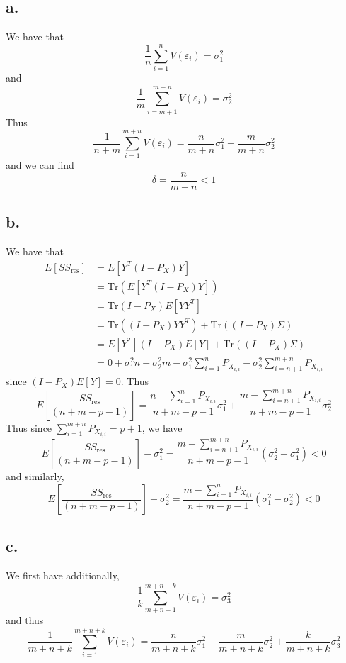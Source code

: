 \documentclass[11pt]{article}
\theoremstyle{mystyle}
\theoremstyle{definition}
\begin{document}
\subsection*{a.}
We have that 
\[
  \displaystyle\frac{1}{n} \sum_{i=1}^n V(\varepsilon_i) = \sigma_1^2
\]
and
\[
  \displaystyle\frac{1}{m} \sum_{i=m+1}^{m+n} V(\varepsilon_i) = \sigma_2^2
\]
Thus 
\[
  \displaystyle\frac{1}{n+m} \sum_{i=1}^{m+n} V(\varepsilon_i) = \displaystyle\frac{n}{m+n} \sigma_1^2 + \displaystyle\frac{m}{m+n} \sigma_2^2
\]
and we can find 
\[
  \delta = \displaystyle\frac{n}{m+n} < 1
\]
\subsection*{b.}
We have that 
\begin{align*} 
  E[SS_{\text{res}}] &= E[Y^T (I-P_X)Y]  \\
  &= \text{Tr}(E[Y^T (I-P_X)Y]) \\
  &= \text{Tr}(I-P_X) E[YY^T] \\
  &= \text{Tr}((I-P_X)YY^T) + \text{Tr}((I-P_X)\Sigma)  \\
  &= E[Y^T] (I-P_X)E[Y] + \text{Tr} ((I-P_X) \Sigma) \\
  &= 0 + \sigma_1^2 n + \sigma_2^2 m - \sigma_1^2 \sum_{i=1}^n P_{X_{i,i}} - \sigma_2^2 \sum_{i=n+1}^{m+n} P_{X_{i,i}}
\end{align*}
since $(I-P_X)E[Y]= 0$. 
Thus 
\[
  E\left[\frac{SS_{\text{res}}}{(n+m-p-1)}\right] = \displaystyle\frac{n- \sum_{i=1}^n P_{X_{i,i}}}{n+m-p-1}\sigma_1^2 + \displaystyle\frac{m-\sum_{i=n+1}^{m+n} P_{X_{i,i}}}{n+m-p-1} \sigma_2^2  
\]
Thus since $\sum_{i=1}^{m+n} P_{X_{i,i}} = p+1$, we have 
\[
  E\left[\frac{SS_{\text{res}}}{(n+m-p-1)}\right] - \sigma_1^2 =   \displaystyle\frac{m-\sum_{i=n+1}^{m+n} P_{X_{i,i}}}{n+m-p-1} (\sigma_2^2 -\sigma_1^2) < 0
\]
and similarly, 
\[
  E\left[\frac{SS_{\text{res}}}{(n+m-p-1)}\right] - \sigma_2^2 =   \displaystyle\frac{m-\sum_{i=1}^{n} P_{X_{i,i}}}{n+m-p-1} (\sigma_1^2 -\sigma_2^2) < 0
\]
\subsection*{c.}
We first have additionally, 
\[
  \displaystyle\frac{1}{k} \sum_{m+n+1}^{m+n+k} V(\varepsilon_i) = \sigma_3^2
\]
and thus 
\[
  \displaystyle\frac{1}{m+n+k} \sum_{i=1}^{m+n+k}V(\varepsilon_i) = \displaystyle\frac{n}{m+n+k} \sigma_1^2 + \displaystyle\frac{m}{m+n+k}\sigma_2^2 + \displaystyle\frac{k}{m+n+k}\sigma_3^2
\]
\end{document}
